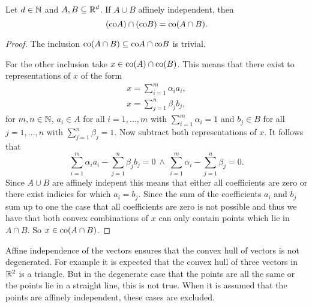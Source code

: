 \begin{rem}
  Let $d\in\mathbb{N}$ and $A,B \subseteq \mathbb{R}^d$. If $A \cup B$ affinely independent, then
  \begin{equation*}
    ({\rm co} A) \cap ({\rm co}B) = {\rm co}(A \cap B).
  \end{equation*}
\end{rem}

\begin{proof}
  The inclusion ${\rm co}(A\cap B) \subseteq {\rm co}A \cap {\rm co}B$ is trivial.

  For the other inclusion take $x \in {\rm co}(A) \cap {\rm co}(B)$. This means that there exist to representations of $x$ of the form
  \begin{align*}
    x = \sum\limits_{i=1}^m\alpha_i a_i, \\
    x = \sum\limits_{j=1}^n\beta_j b_j,
  \end{align*}
  for $m,n \in \mathbb{N}$, $a_i \in A$ for all $i = 1, \ldots, m$ with $\sum\limits_{i=1}^m \alpha_i = 1$ and $b_j \in B$ for all $j =1, \ldots,n$ with $\sum\limits_{j=1}^n\beta_j = 1$.
  Now subtract both representations of $x$. It follows that
  \begin{equation*}
    \sum\limits_{i=1}^m\alpha_i a_i - \sum\limits_{j=1}^n\beta_j b_j = 0 \: \land \: \sum\limits_{i=1}^m \alpha_i - \sum\limits_{j=1}^n\beta_j = 0.
  \end{equation*}
  Since $A \cup B$ are affinely indepent this means that either all coefficients are zero or there exist indicies for which $a_i = b_j$. Since the sum of the coefficients $a_i$ and $b_j$ sum up to one the case that all coefficients are zero is not possible and thus we have that both convex combinations of $x$ can only contain points which lie in $A \cap B$. So $x \in {\rm co}(A\cap B)$.
\end{proof}

\vspace*{-10px}
Affine independence of the vectors ensures that the convex hull of vectors is not degenerated.
For example it is expected that the convex hull of three vectors in $\mathbb{R}^2$ is a triangle. But in the degenerate case that the points are all the same
or the points lie in a straight line, this is not true. When it is assumed that the points are affinely independent, these cases are excluded. 

